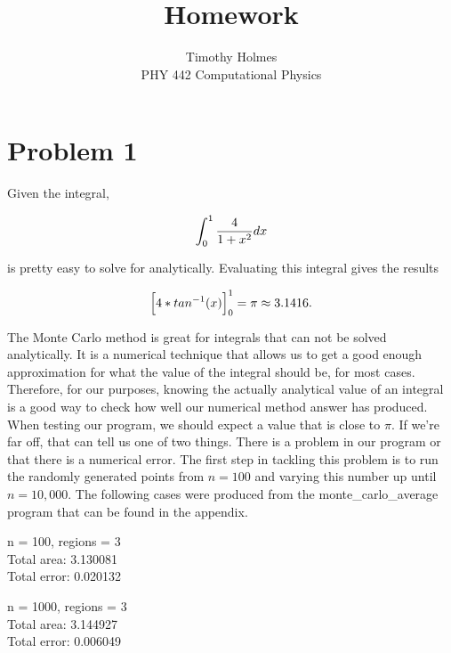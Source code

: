 \documentclass[12pt]{article}
\begin{document}
 
 
\title{Homework }
\author{Timothy Holmes\\ %
PHY 442 Computational Physics}

\maketitle

\section*{Problem 1}

Given the integral,

$$
\int_{0}^{1} \frac{4}{1 + x^2} dx \\
$$

is pretty easy to solve for analytically. Evaluating this integral gives the results

$$
\Big[4 * tan^{-1}(x) \Big]_{0}^{1} = \pi \approx 3.1416. \\
$$

The Monte Carlo method is great for integrals that can not be solved analytically. It is a numerical technique that allows us to get a good enough approximation for what the value of the integral should be, for most cases. Therefore, for our purposes, knowing the actually analytical value of an integral is a good way to check how well our numerical method answer has produced. When testing our program, we should expect a value that is close to $\pi$. If we're far off, that can tell us one of two things. There is a problem in our program or that there is a numerical error. The first step in tackling this problem is to run the randomly generated points from $n = 100$ and varying this number up until $n = 10,000$. The following cases were produced from the monte\_carlo\_average program that can be found in the appendix.\\


\begin{center}
n = 100, regions = 3 \\
Total area: 3.130081 \\
Total error: 0.020132 \\
\end{center}

\begin{center}
n = 1000, regions = 3 \\
Total area: 3.144927 \\
Total error: 0.006049 \\
\end{center}
\end{document}
